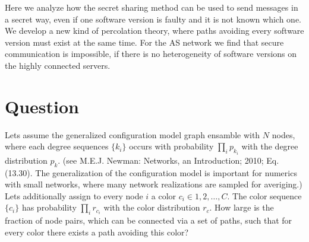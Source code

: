 \documentclass[aps, pre, onecolumn, a4paper, floatfix]{revtex4}
\begin{document}
Here we analyze how the secret sharing method can be used to send
messages in a secret way, even if one software version is faulty and it is
not known which one. We develop a new kind of percolation theory, where
paths avoiding every software version must exist at the same time.
For the AS network we find that secure communication is impossible, if
there is no heterogeneity of software versions on the highly connected
servers.



\section{Question}

Lets assume the generalized configuration model graph ensamble with $N$ nodes, 
where each degree sequences $\{k_i\}$ occurs with probability $\prod_i p_{k_i}$ 
with the degree distribution $p_{k}$. 
(see M.E.J. Newman: Networks, an Introduction; 2010; Eq. (13.30). The generalization 
of the configuration model is important for numerics with small networks, where 
many network realizations are sampled for averiging.) Lets additionally assign to 
every node $i$ a color $c_i\in 1,2,\dots,C$. The color sequence $\{c_i\}$ has 
probability $\prod_i r_{c_i}$ with the color distribution $r_c$. 
How large is the fraction of node pairs, which can be connected via a set of  
paths, such that for every color there exists a path avoiding this color? 
\end{document}
